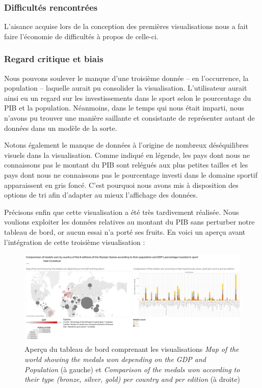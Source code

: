 \documentclass[hidelinks, 12pt]{report}
\begin{document}
\subsubsection{Difficultés rencontrées}

L'aisance acquise lors de la conception des premières visualisations nous a fait faire l'économie de difficultés à propos de celle-ci.

\subsubsection{Regard critique et biais}

Nous pouvons soulever le manque d'une troisième donnée -- en l'occurrence, la population -- laquelle aurait pu consolider la visualisation. L'utilisateur aurait ainsi eu un regard sur les investissements dans le sport selon le pourcentage du PIB et la population. Néanmoins, dans le temps qui nous était imparti, nous n'avons pu trouver une manière saillante et consistante de représenter autant de données dans un modèle de la sorte.

Notons également le manque de données à l'origine de nombreux déséquilibres visuels dans la visualisation. Comme indiqué en légende, les pays dont nous ne connaissons pas le montant du PIB sont relégués aux plus petites tailles et les pays dont nous ne connaissons pas le pourcentage investi dans le domaine sportif apparaissent en gris foncé. C'est pourquoi nous avons mis à disposition des options de tri afin d'adapter au mieux l'affichage des données.
\newline

Précisons enfin que cette visualisation a été très tardivement réalisée. Nous voulions exploiter les données relatives au montant du PIB sans perturber notre tableau de bord, or aucun essai n'a porté ses fruits. En voici un aperçu avant l'intégration de cette troisième visualisation :

\begin{center}
	\begin{figure}[H]
		\centering
		\setlength{\belowcaptionskip}{-35pt}
		\includegraphics[scale=0.25]{images/datavis-medals-world-tab.jpeg}
		\captionsetup{justification=centering}
		\caption{Aperçu du tableau de bord comprenant les visualisations \textit{Map of the world showing the medals won depending on the GDP and Population} (à gauche) et \textit{Comparison of the medals won according to their type (bronze, silver, gold) per country and per edition} (à droite)}
	\end{figure}
\end{center}
\end{document}

